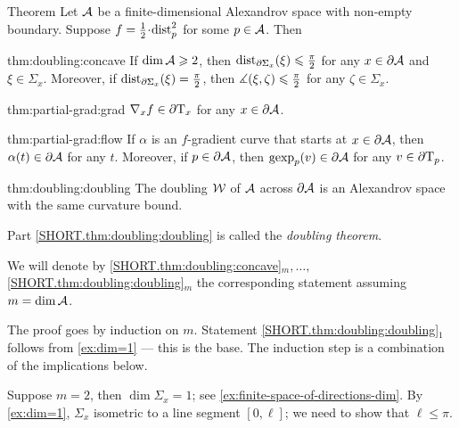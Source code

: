 \begin{thm}{Theorem}\label{thm:doubling}
Let $\mathcal{A}$ be a finite-dimensional Alexandrov space with non-empty boundary.
Suppose $f\z=\tfrac12\cdot\distfun_p^2$ for some $p\in \mathcal{A}$.
Then

\begin{subthm}{thm:doubling:concave}
If $\operatorname{\rm dim}\nolimits \mathcal{A}\geqslant 2$, then
$\mathrm{dist}_{\partial \Sigma_x}(\xi)\leqslant \tfrac\pi2$ for any $x\in\partial \mathcal{A}$ and $\xi\in \Sigma_x$.
Moreover, if $\mathrm{dist}_{\partial \Sigma_x}(\xi)= \tfrac\pi2$, then $\measuredangle(\xi,\zeta)\leqslant\tfrac\pi2$ for any $\zeta\in \Sigma_x$. 
\end{subthm}

\begin{subthm}{thm:partial-grad:grad}
$\nabla_xf\in \partial\mathrm{T}_x$ for any $x\in\partial \mathcal{A}$.
\end{subthm}

\begin{subthm}{thm:partial-grad:flow}
If $\alpha$ is an $f$-gradient curve that starts at $x\in \partial \mathcal{A}$, then $\alpha(t)\in \partial \mathcal{A}$ for any $t$.
Moreover, if $p\in \partial \mathcal{A}$, then $\operatorname{\rm gexp}\nolimits_p(v)\in \partial \mathcal{A}$ for any $v\in\partial\mathrm{T}_p$.
\end{subthm}

\begin{subthm}{thm:doubling:doubling}
The doubling $\mathcal{W}$ of $\mathcal{A}$ across $\partial \mathcal{A}$ is an Alexandrov space with the same curvature bound.
\end{subthm}

\end{thm}

Part \ref{SHORT.thm:doubling:doubling} is called the \emph{doubling theorem}.

We will denote by 
\ref{SHORT.thm:doubling:concave}$_m,\dots,$\ref{SHORT.thm:doubling:doubling}$_m$ the corresponding statement assuming $m=\operatorname{\rm dim}\nolimits\mathcal{A}$.

The proof goes by induction on $m$.
Statement \ref{SHORT.thm:doubling:doubling}$_1$ follows from \ref{ex:dim=1} --- this is the base.
The induction step is a combination of the implications below.

Suppose $m=2$, then $\dim\Sigma_x=1$; see \ref{ex:finite-space-of-directions-dim}.
By \ref{ex:dim=1}, $\Sigma_x$ isometric to a line segment $[0,\ell]$;
we need to show that $\ell\le\pi$.

